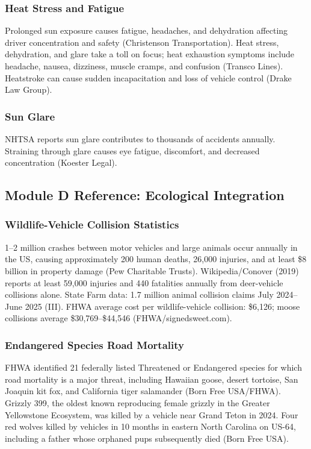 \documentclass[11pt,letterpaper]{article}
\begin{document}
\subsubsection{Heat Stress and Fatigue}
Prolonged sun exposure causes fatigue, headaches, and dehydration affecting driver concentration and safety (Christenson Transportation). Heat stress, dehydration, and glare take a toll on focus; heat exhaustion symptoms include headache, nausea, dizziness, muscle cramps, and confusion (Transco Lines). Heatstroke can cause sudden incapacitation and loss of vehicle control (Drake Law Group).

\subsubsection{Sun Glare}
NHTSA reports sun glare contributes to thousands of accidents annually. Straining through glare causes eye fatigue, discomfort, and decreased concentration (Koester Legal).

\subsection{Module D Reference: Ecological Integration}

\subsubsection{Wildlife-Vehicle Collision Statistics}
1--2 million crashes between motor vehicles and large animals occur annually in the US, causing approximately 200 human deaths, 26,000 injuries, and at least \$8 billion in property damage (Pew Charitable Trusts). Wikipedia/Conover (2019) reports at least 59,000 injuries and 440 fatalities annually from deer-vehicle collisions alone. State Farm data: 1.7 million animal collision claims July 2024--June 2025 (III). FHWA average cost per wildlife-vehicle collision: \$6,126; moose collisions average \$30,769--\$44,546 (FHWA/signedsweet.com).

\subsubsection{Endangered Species Road Mortality}
FHWA identified 21 federally listed Threatened or Endangered species for which road mortality is a major threat, including Hawaiian goose, desert tortoise, San Joaquin kit fox, and California tiger salamander (Born Free USA/FHWA). Grizzly 399, the oldest known reproducing female grizzly in the Greater Yellowstone Ecosystem, was killed by a vehicle near Grand Teton in 2024. Four red wolves killed by vehicles in 10 months in eastern North Carolina on US-64, including a father whose orphaned pups subsequently died (Born Free USA).
\end{document}
